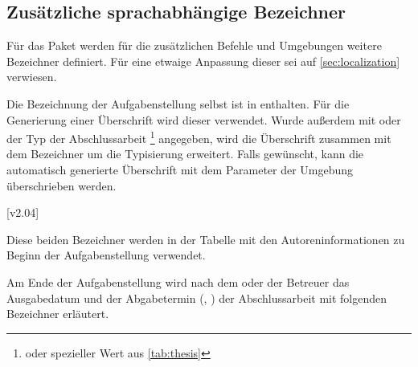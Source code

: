 \begin{DeclareEntity}{}
\section{Zusätzliche sprachabhängige Bezeichner}
%
%
Für das Paket  werden für die zusätzlichen Befehle 
und Umgebungen weitere Bezeichner definiert. Für eine etwaige Anpassung dieser 
sei auf \autoref{sec:localization} verwiesen.

\begin{Declaration}
  {}
\begin{Declaration}
  {}
\printdeclarationlist

Die Bezeichnung der Aufgabenstellung selbst ist in  enthalten. 
Für die Generierung einer Überschrift wird dieser verwendet. Wurde außerdem mit 
 oder  der Typ der Abschlussarbeit%
\footnote{%
   oder spezieller Wert aus \autoref{tab:thesis}%
}
angegeben, wird die Überschrift zusammen mit dem Bezeichner 
um die Typisierung erweitert. Falls gewünscht, kann die automatisch generierte 
Überschrift mit dem Parameter  der Umgebung 
 überschrieben werden.
\end{Declaration}
\end{Declaration}

\begin{Declaration}
  {}
  [v2.04]
\begin{Declaration}
  {}
\printdeclarationlist

Diese beiden Bezeichner werden in der Tabelle mit den Autoreninformationen zu 
Beginn der Aufgabenstellung verwendet.
\end{Declaration}
\end{Declaration}

\begin{Declaration}
  {}
\begin{Declaration}
  {}
\printdeclarationlist

Am Ende der Aufgabenstellung wird nach dem oder der Betreuer das Ausgabedatum 
und der Abgabetermin (, ) der Abschlussarbeit 
mit folgenden Bezeichner erläutert.
\end{Declaration}
\end{Declaration}


\end{DeclareEntity}
